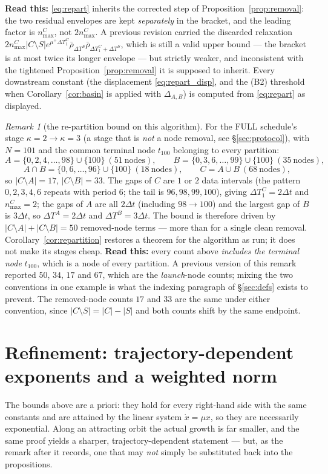 \documentclass[11pt]{article}
\theoremstyle{remark}\newtheorem{remark}{Remark}
\newcommand{\readthis}[1]{\textbf{Read this:} #1}
\begin{document}
\readthis{\eqref{eq:repart} inherits the corrected step of Proposition~\ref{prop:removal}: the two residual envelopes are kept \emph{separately} in the bracket, and the leading factor is $n^{C}_{\max}$, not $2n^{C}_{\max}$. A previous revision carried the discarded relaxation $2n^{C}_{\max}|C\setminus S|e^{\mu^{+}\Delta T_1^{C}}\bar\rho_{\Delta T^{S}}\bar\rho_{\Delta T_1^{C}+\Delta T^{S}}$, which is still a valid upper bound --- the bracket is at most twice its longer envelope --- but strictly weaker, and inconsistent with the tightened Proposition~\ref{prop:removal} it is supposed to inherit. Every downstream constant (the displacement \eqref{eq:repart_disp}, and the (B2) threshold when Corollary~\ref{cor:basin} is applied with $\Delta_{A,B}$) is computed from \eqref{eq:repart} as displayed.}

\begin{remark}[the re-partition bound on this algorithm]\label{rem:repart_numbers}
For the FULL schedule's stage $\kappa=2\to\kappa=3$ (a stage that is \emph{not} a node removal, see \S\ref{sec:protocol}), with $N=101$ and the common terminal node $t_{100}$ belonging to every partition:
\[
A=\{0,2,4,\dots,98\}\cup\{100\}\ (51\ \text{nodes}),\qquad
B=\{0,3,6,\dots,99\}\cup\{100\}\ (35\ \text{nodes}),
\]
\[
A\cap B=\{0,6,\dots,96\}\cup\{100\}\ (18\ \text{nodes}),\qquad
C=A\cup B\ (68\ \text{nodes}),
\]
so $|C\setminus A|=17$, $|C\setminus B|=33$. The gaps of $C$ are $1$ or $2$ data intervals (the pattern $0,2,3,4,6$ repeats with period $6$; the tail is $96,98,99,100$), giving $\Delta T_1^{C}=2\Delta t$ and $n^{C}_{\max}=2$; the gaps of $A$ are all $2\Delta t$ (including $98\to100$) and the largest gap of $B$ is $3\Delta t$, so $\Delta T^{A}=2\Delta t$ and $\Delta T^{B}=3\Delta t$. The bound is therefore driven by $|C\setminus A|+|C\setminus B|=50$ removed-node terms --- more than for a single clean removal. Corollary~\ref{cor:repartition} restores a theorem for the algorithm as run; it does not make its stages cheap.
\readthis{every count above \emph{includes the terminal node} $t_{100}$, which is a node of every partition. A previous version of this remark reported $50$, $34$, $17$ and $67$, which are the \emph{launch}-node counts; mixing the two conventions in one example is what the indexing paragraph of \S\ref{sec:defs} exists to prevent. The removed-node counts $17$ and $33$ are the same under either convention, since $|C\setminus S|=|C|-|S|$ and both counts shift by the same endpoint.}
\end{remark}

\section{Refinement: trajectory-dependent exponents and a weighted norm}\label{sec:refine}
The bounds above are a priori: they hold for every right-hand side with the same constants and are attained by the linear system $\dot x=\mu x$, so they are necessarily exponential. Along an attracting orbit the actual growth is far smaller, and the same proof yields a sharper, trajectory-dependent statement --- but, as the remark after it records, one that may \emph{not} simply be substituted back into the propositions.
\end{document}
